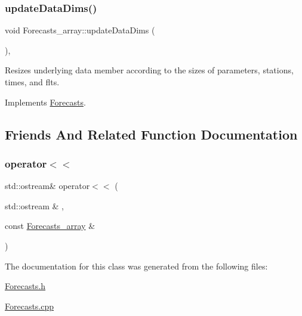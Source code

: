 \mbox{\label{class_forecasts__array_ab3fc780bb6a5cbf132457c8c336bc777}} 
\subsubsection{\texorpdfstring{update\+Data\+Dims()}{updateDataDims()}}
{\footnotesize\ttfamily void Forecasts\+\_\+array\+::update\+Data\+Dims (\begin{DoxyParamCaption}{ }\end{DoxyParamCaption})\hspace{0.3cm}{\ttfamily [override]}, {\ttfamily [virtual]}}

Resizes underlying data member according to the sizes of parameters, stations, times, and flts. 

Implements \mbox{\hyperlink{class_forecasts_a8c7d29af8edb5c3bc6a6aad2220506a9}{Forecasts}}.



\subsection{Friends And Related Function Documentation}
\mbox{\label{class_forecasts__array_a6bde933a6e00ad1328f834e4f5d98606}} 
\subsubsection{\texorpdfstring{operator$<$$<$}{operator<<}}
{\footnotesize\ttfamily std\+::ostream\& operator$<$$<$ (\begin{DoxyParamCaption}\item[{std\+::ostream \&}]{,  }\item[{const \mbox{\hyperlink{class_forecasts__array}{Forecasts\+\_\+array}} \&}]{ }\end{DoxyParamCaption})\hspace{0.3cm}{\ttfamily [friend]}}



The documentation for this class was generated from the following files\+:\begin{DoxyCompactItemize}
\item 
\mbox{\hyperlink{_forecasts_8h}{Forecasts.\+h}}\item 
\mbox{\hyperlink{_forecasts_8cpp}{Forecasts.\+cpp}}\end{DoxyCompactItemize}
